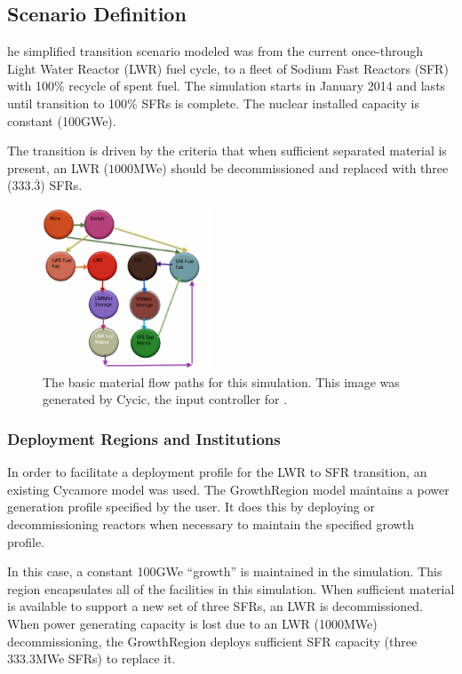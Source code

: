 \subsection{Scenario Definition}
he simplified transition scenario modeled was from the current once-through
Light Water Reactor (LWR) fuel cycle, to a fleet of Sodium Fast Reactors (SFR)
with 100\% recycle of spent fuel.  The simulation starts in January 2014 and
lasts until transition to 100\% SFRs is complete. The nuclear installed
capacity is constant (100GWe).

The transition is driven by the criteria that when sufficient separated
material is present, an LWR ($1000$MWe) should be decommissioned and replaced
with three ($333.\bar{3}$) SFRs.

\begin{figure}[htpb!]
\begin{center}
\includegraphics[width=0.45\textwidth]{cycic_img.eps}
\end{center}
\caption{The basic material flow paths for this simulation. This image was 
generated by Cycic, the input controller for \Cyclus 
\cite{flannagan_cycic_2013}.}
\label{fig:cycic_img}
\end{figure}

\subsubsection{Deployment Regions and Institutions}

In order to facilitate a deployment profile for the LWR to SFR transition, an 
existing Cycamore model was used. The GrowthRegion model maintains a 
power generation profile specified by the user. It does this by deploying or 
decommissioning reactors when necessary to maintain the specified growth 
profile.  

In this case, a constant 100GWe ``growth'' is maintained in the simulation. 
This region encapsulates all of the facilities in this simulation. 
When sufficient material is available to support a new set of three SFRs, an 
LWR is decommissioned. When power generating capacity is lost due to an LWR 
(1000MWe) decommissioning, the GrowthRegion deploys sufficient SFR capacity 
(three 333.3MWe SFRs) to replace it. 

